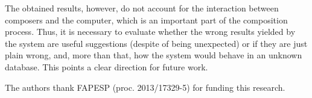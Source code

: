 \documentclass{article}
\begin{document}
The obtained results, however, do not account for the interaction
between composers and the computer, which is an important part of the
composition process. Thus, it is necessary to
evaluate whether the wrong results yielded by the system are useful
suggestions (despite of being unexpected) or if they are just plain
wrong, and, more than that, how the system would behave in an unknown
database. This points a clear direction for future work.

\begin{acknowledgments}
The authors thank FAPESP (proc. 2013/17329-5) for funding this research.
\end{acknowledgments} 


\end{document}
